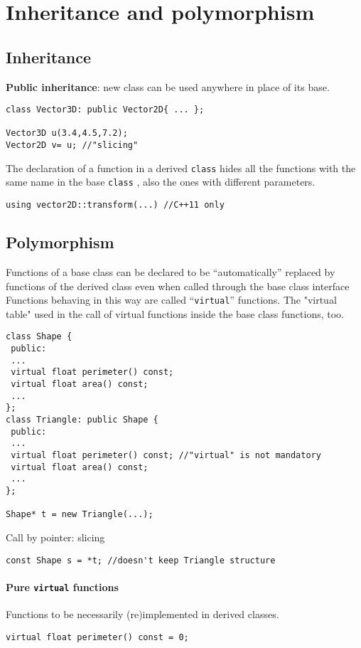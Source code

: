 \documentclass{article}
\newcommand{\code}[1]{\texttt {#1}}
\begin{document}
\section{Inheritance and polymorphism}

\subsection{Inheritance}
\textbf{Public inheritance}: new class can be used anywhere in place of its base.
\begin{lstlisting}
class Vector3D: public Vector2D{ ... };

Vector3D u(3.4,4.5,7.2);
Vector2D v= u; //"slicing"

\end{lstlisting}

The declaration of a function in a derived \code{class}
hides all the functions with the same name in the base \code{class} ,
also the ones with different parameters. 
\begin{lstlisting}
using vector2D::transform(...) //C++11 only
\end{lstlisting}


\subsection{Polymorphism}Functions of a base class can be declared to be
“automatically” replaced by functions of the derived class
even when called through the base class interface
Functions behaving in this way are called “\code{virtual}” functions. The "virtual table" used in the call of virtual functions
inside the base class functions, too.
\begin{lstlisting}
class Shape {
 public:
 ... 
 virtual float perimeter() const;
 virtual float area() const;
 ...
};
class Triangle: public Shape {
 public:
 ...
 virtual float perimeter() const; //"virtual" is not mandatory
 virtual float area() const;
 ...
};

Shape* t = new Triangle(...);
\end{lstlisting}

Call by pointer: slicing
\begin{lstlisting}
const Shape s = *t; //doesn't keep Triangle structure
\end{lstlisting}

\paragraph{Pure \code{virtual} functions}
Functions to be necessarily
(re)implemented in derived classes.
\begin{lstlisting}
virtual float perimeter() const = 0;
\end{lstlisting}
\end{document}
